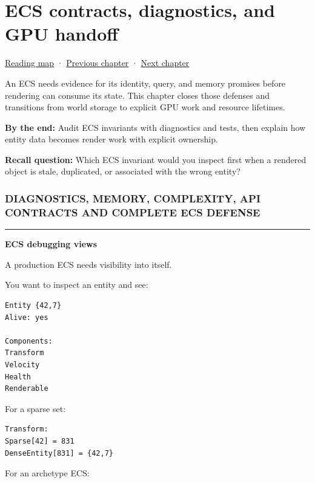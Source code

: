 \hypertarget{05-engine-i-ch018}{}
\chapter{ECS contracts, diagnostics, and GPU handoff}\label{05-engine-i-ch018-ecs-contracts-diagnostics-and-gpu-handoff}

\hyperref[volume-reading-map]{Reading map} · \hyperref[05-engine-i-ch017-ecs-performance-through-cache-and-scheduling]{Previous chapter} · \hyperref[05-engine-i-ch019-gpu-work-and-reusable-metal-frames]{Next chapter}

An ECS needs evidence for its identity, query, and memory promises before rendering can consume its state. This chapter closes those defenses and transitions from world storage to explicit GPU work and resource lifetimes.

\textbf{By the end:} Audit ECS invariants with diagnostics and tests, then explain how entity data becomes render work with explicit ownership.

\textbf{Recall question:} Which ECS invariant would you inspect first when a rendered object is stale, duplicated, or associated with the wrong entity?

\subsection{DIAGNOSTICS, MEMORY, COMPLEXITY, API CONTRACTS AND COMPLETE ECS DEFENSE}\label{05-engine-i-ch018-diagnostics-memory-complexity-api-contracts-and-complete-ecs-defense}

\begin{center}\rule{0.5\linewidth}{0.5pt}\end{center}

\textbf{ECS debugging views}

A production ECS needs visibility into itself.

You want to inspect an entity and see:

\begin{verbatim}
Entity {42,7}
Alive: yes

Components:
Transform
Velocity
Health
Renderable
\end{verbatim}

For a sparse set:

\begin{verbatim}
Transform:
Sparse[42] = 831
DenseEntity[831] = {42,7}
\end{verbatim}

For an archetype ECS:

